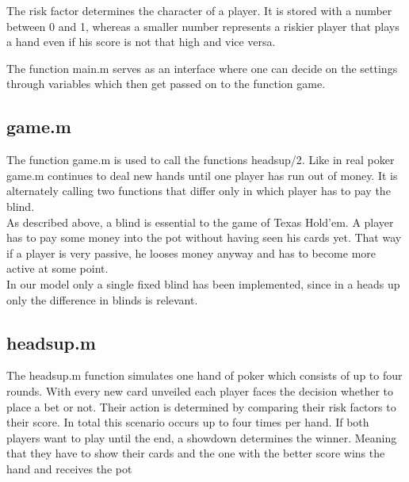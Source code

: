\documentclass[11pt]{article}
\begin{document}
The risk factor determines the character of a player. It is stored with a number between 0 and 1, whereas a smaller number represents a riskier player that plays a hand even if his score is not that high and vice versa.


The function main.m serves as an interface where one can decide on the settings through variables which then get passed on to the function game.

 

\subsection{game.m}

The function game.m is used to call the functions headsup/2. Like in real poker game.m continues to deal new hands until one player has run out of money. It is alternately calling two functions that differ only in which player has to pay the blind.\\

As described above, a blind is essential to the game of Texas Hold'em. A player has to pay some money into the pot without having seen his cards yet. That way if a player is very passive, he looses money anyway and has to become more active at some point. \\

In our model only a single fixed blind has been implemented, since in a heads up only the difference in blinds is relevant.

 

\subsection{headsup.m}

The headsup.m function simulates one hand of poker which consists of up to four rounds. With every new card unveiled each player faces the decision whether to place a bet or not. Their action is determined by comparing their risk factors to their score. In total this scenario occurs up to four times per hand. If both players want to play until the end, a showdown determines the winner. Meaning that they have to show their cards and the one with the better score wins the hand and receives the pot\\
\end{document}
